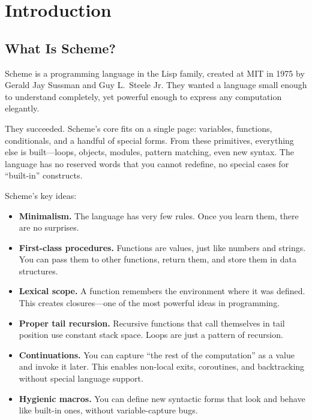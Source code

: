 \chapter{Introduction}
\label{ch:introduction}

\section{What Is Scheme?}

Scheme is a programming language in the Lisp family, created at MIT in 1975 by Gerald Jay Sussman and Guy L.\ Steele Jr. They wanted a language small enough to understand completely, yet powerful enough to express any computation elegantly.

They succeeded. Scheme's core fits on a single page: variables, functions, conditionals, and a handful of special forms. From these primitives, everything else is built---loops, objects, modules, pattern matching, even new syntax. The language has no reserved words that you cannot redefine, no special cases for ``built-in'' constructs.

Scheme's key ideas:

\begin{itemize}
    \item \textbf{Minimalism.} The language has very few rules. Once you learn them, there are no surprises.
    \item \textbf{First-class procedures.} Functions are values, just like numbers and strings. You can pass them to other functions, return them, and store them in data structures.
    \item \textbf{Lexical scope.} A function remembers the environment where it was defined. This creates closures---one of the most powerful ideas in programming.
    \item \textbf{Proper tail recursion.} Recursive functions that call themselves in tail position use constant stack space. Loops are just a pattern of recursion.
    \item \textbf{Continuations.} You can capture ``the rest of the computation'' as a value and invoke it later. This enables non-local exits, coroutines, and backtracking without special language support.
    \item \textbf{Hygienic macros.} You can define new syntactic forms that look and behave like built-in ones, without variable-capture bugs.
\end{itemize}


